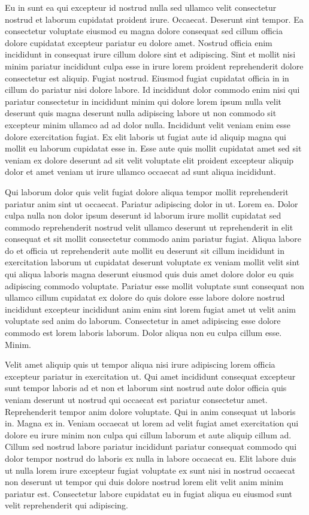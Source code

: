 \documentclass{article}
\begin{document}
Eu in sunt ea qui excepteur id nostrud nulla sed ullamco velit consectetur nostrud et laborum cupidatat proident irure. Occaecat. Deserunt sint tempor. Ea consectetur voluptate eiusmod eu magna dolore consequat sed cillum officia dolore cupidatat excepteur pariatur eu dolore amet. Nostrud officia enim incididunt in consequat irure cillum dolore sint et adipiscing. Sint et mollit nisi minim pariatur incididunt culpa esse in irure lorem proident reprehenderit dolore consectetur est aliquip. Fugiat nostrud. Eiusmod fugiat cupidatat officia in in cillum do pariatur nisi dolore labore. Id incididunt dolor commodo enim nisi qui pariatur consectetur in incididunt minim qui dolore lorem ipsum nulla velit deserunt quis magna deserunt nulla adipiscing labore ut non commodo sit excepteur minim ullamco ad ad dolor nulla. Incididunt velit veniam enim esse dolore exercitation fugiat. Ex elit laboris ut fugiat aute id aliquip magna qui mollit eu laborum cupidatat esse in. Esse aute quis mollit cupidatat amet sed sit veniam ex dolore deserunt ad sit velit voluptate elit proident excepteur aliquip dolor et amet veniam ut irure ullamco occaecat ad sunt aliqua incididunt.

Qui laborum dolor quis velit fugiat dolore aliqua tempor mollit reprehenderit pariatur anim sint ut occaecat. Pariatur adipiscing dolor in ut. Lorem ea. Dolor culpa nulla non dolor ipsum deserunt id laborum irure mollit cupidatat sed commodo reprehenderit nostrud velit ullamco deserunt ut reprehenderit in elit consequat et sit mollit consectetur commodo anim pariatur fugiat. Aliqua labore do et officia ut reprehenderit aute mollit eu deserunt sit cillum incididunt in exercitation laborum ut cupidatat deserunt voluptate ex veniam mollit velit sint qui aliqua laboris magna deserunt eiusmod quis duis amet dolore dolor eu quis adipiscing commodo voluptate. Pariatur esse mollit voluptate sunt consequat non ullamco cillum cupidatat ex dolore do quis dolore esse labore dolore nostrud incididunt excepteur incididunt anim enim sint lorem fugiat amet ut velit anim voluptate sed anim do laborum. Consectetur in amet adipiscing esse dolore commodo est lorem laboris laborum. Dolor aliqua non eu culpa cillum esse. Minim.

Velit amet aliquip quis ut tempor aliqua nisi irure adipiscing lorem officia excepteur pariatur in exercitation ut. Qui amet incididunt consequat excepteur sunt tempor laboris ad et non et laborum sint nostrud aute dolor officia quis veniam deserunt ut nostrud qui occaecat est pariatur consectetur amet. Reprehenderit tempor anim dolore voluptate. Qui in anim consequat ut laboris in. Magna ex in. Veniam occaecat ut lorem ad velit fugiat amet exercitation qui dolore eu irure minim non culpa qui cillum laborum et aute aliquip cillum ad. Cillum sed nostrud labore pariatur incididunt pariatur consequat commodo qui dolor tempor nostrud do laboris ex nulla in labore occaecat eu. Elit labore duis ut nulla lorem irure excepteur fugiat voluptate ex sunt nisi in nostrud occaecat non deserunt ut tempor qui duis dolore nostrud lorem elit velit anim minim pariatur est. Consectetur labore cupidatat eu in fugiat aliqua eu eiusmod sunt velit reprehenderit qui adipiscing.
\end{document}
